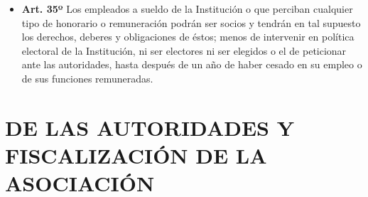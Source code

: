 \documentclass[]{book}
\providecommand{\tightlist}{%
  \setlength{\itemsep}{0pt}\setlength{\parskip}{0pt}}
\begin{document}
\begin{itemize}
\tightlist
\item
  \textbf{Art. 35º}
  Los empleados a sueldo de la Institución o que perciban cualquier tipo de honorario o remuneración podrán ser socios y tendrán en tal supuesto los derechos, deberes y obligaciones de éstos; menos de intervenir en política electoral de la Institución, ni ser electores ni ser elegidos o el de peticionar ante las autoridades, hasta después de un año de haber cesado en su empleo o de sus funciones remuneradas.
\end{itemize}

\hypertarget{cap5}{%
\chapter{DE LAS AUTORIDADES Y FISCALIZACIÓN DE LA ASOCIACIÓN}\label{cap5}}
\end{document}
